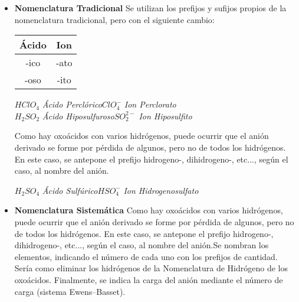 \begin{itemize}
	\item\textbf{Nomenclatura Tradicional} Se utilizan los prefijos y sufijos propios de la nomenclatura tradicional, pero con el siguiente cambio:
	\begin{table}[h!]
		\centering
		\begin{tabular}{c|c}
			Ácido&Ion\\ \hline
			-ico&-ato\\
			-oso&-ito\\ \hline
		\end{tabular}
	\end{table}

\begin{center}
	$HClO_4$ \hspace{0.3cm}\textit{Ácido Perclórico}\hspace{1cm}$ClO_{4}^{-}$ \hspace{0.3cm} \textit{Ion Perclorato}\\ \vspace{0,3cm}
	$H_2SO_2$ \hspace{0.3cm}\textit{Ácido Hiposulfuroso}\hspace{1cm}$SO_{2}^{2-}$ \hspace{0.3cm} \textit{Ion Hiposulfito}\\
\end{center}
	Como hay oxoácidos con varios hidrógenos, puede ocurrir que el anión derivado se forme por pérdida de algunos, pero no de todos los hidrógenos. En este caso, se antepone el prefijo hidrogeno-, dihidrogeno-, etc..., según el caso, al nombre del anión.	
\begin{center}
	$H_2SO_4$ \hspace{0.3cm}\textit{Ácido Sulfúrico}\hspace{1cm}$HSO_{4}^{-}$ \hspace{0.3cm} \textit{Ion Hidrogenosulfato}\\
\end{center}
	\item\textbf{Nomenclatura Sistemática} Como hay oxoácidos con varios hidrógenos, puede ocurrir que el anión derivado se forme por pérdida de algunos, pero no de todos los hidrógenos. En este caso, se antepone el prefijo hidrogeno-, dihidrogeno-, etc..., según el caso, al nombre del anión.Se nombran los elementos, indicando el número de cada uno con los prefijos de cantidad. Sería como eliminar los hidrógenos de la Nomenclatura de Hidrógeno de los oxoácidos. Finalmente, se indica la carga del anión mediante el número de carga (sistema Ewens–Basset).

\end{itemize}
